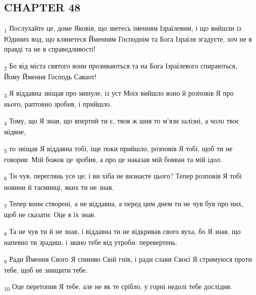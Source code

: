 \subsection{CHAPTER 48}
\begin{tcolorbox}
\textsubscript{1} Послухайте це, доме Яковів, що зветесь іменням Ізраїлевим, і що вийшли із Юдиних вод, що клянетеся Йменням Господнім та Бога Ізраїля згадуєте, хоч не в правді та не в справедливості!
\end{tcolorbox}
\begin{tcolorbox}
\textsubscript{2} Бо від міста святого вони прозиваються та на Бога Ізраїлевого спираються, Йому Ймення Господь Саваот!
\end{tcolorbox}
\begin{tcolorbox}
\textsubscript{3} Я віддавна звіщав про минуле, із уст Моїх вийшло воно й розповів Я про нього, раптовно зробив, і прийшло.
\end{tcolorbox}
\begin{tcolorbox}
\textsubscript{4} Тому, що Я знав, що впертий ти є, твоя ж шия то м'язи залізні, а чоло твоє мідяне,
\end{tcolorbox}
\begin{tcolorbox}
\textsubscript{5} то звіщав Я віддавна тобі, іще поки прийшло, розповів Я тобі, щоб ти не говорив: Мій божок це зробив, а про це наказав мій бовван та мій ідол.
\end{tcolorbox}
\begin{tcolorbox}
\textsubscript{6} Ти чув, переглянь усе це; і ви хіба не визнаєте цього? Тепер розповів Я тобі новини й таємниці, яких ти не знав.
\end{tcolorbox}
\begin{tcolorbox}
\textsubscript{7} Тепер вони створені, а не віддавна, а перед цим днем ти не чув був про них, щоб не сказати: Оце я їх знав.
\end{tcolorbox}
\begin{tcolorbox}
\textsubscript{8} Та не чув ти й не знав, і віддавна ти не відкривав свого вуха, бо Я знав, що напевно ти зрадиш, і звано тебе від утроби: перевертень.
\end{tcolorbox}
\begin{tcolorbox}
\textsubscript{9} Ради Ймення Свого Я спиняю Свій гнів, і ради слави Своєї Я стримуюся проти тебе, щоб не знищити тебе.
\end{tcolorbox}
\begin{tcolorbox}
\textsubscript{10} Оце перетопив Я тебе, але не як те срібло, у горні недолі тебе дослідив.
\end{tcolorbox}
